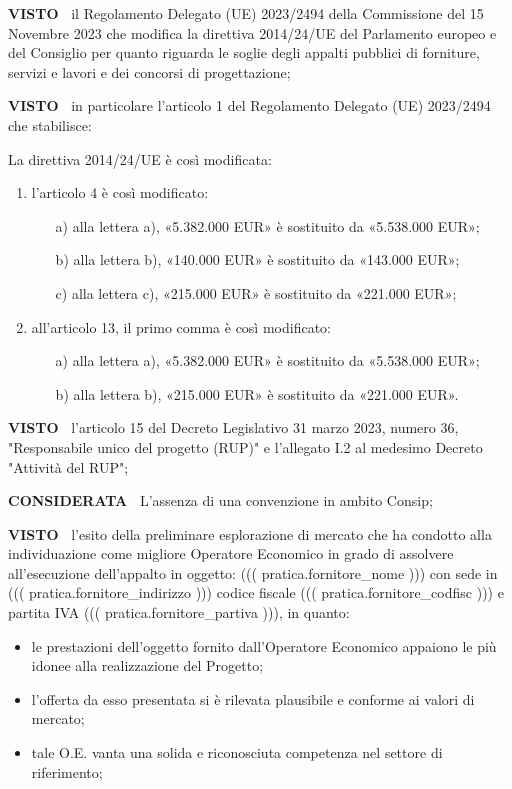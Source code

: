 \textbf{VISTO~} il Regolamento Delegato (UE)
2023/2494 della Commissione del 15 Novembre 2023 che modifica la direttiva
2014/24/UE del Parlamento europeo e del Consiglio per quanto riguarda
le soglie degli appalti pubblici di forniture, servizi e lavori e dei
concorsi di progettazione;

\textbf{VISTO~}  in particolare l'articolo 1 del Regolamento Delegato (UE)
2023/2494 che stabilisce:

La direttiva 2014/24/UE è così modificata: 
\begin{enumerate}
\item l'articolo 4 è così modificato: 
\begin{enumerate}
\item[a)]  alla lettera a), «5.382.000 EUR» è sostituito da «5.538.000 EUR»;
\item[b)]  alla lettera b), «140.000 EUR» è sostituito da «143.000 EUR»; 
\item[c)]  alla lettera c), «215.000 EUR» è sostituito da «221.000 EUR»; 
\end{enumerate}

\item all'articolo 13, il primo comma è così modificato: 
\begin{enumerate}
\item[a)]  alla lettera a), «5.382.000 EUR» è sostituito da «5.538.000 EUR»; 
\item[b)]  alla lettera b), «215.000 EUR» è sostituito da «221.000 EUR».
\end{enumerate}
\end{enumerate}

\textbf{VISTO~} l'articolo 15 del Decreto Legislativo 31
marzo 2023, numero 36, "Responsabile unico del progetto (RUP)" e
l'allegato I.2 al medesimo Decreto "Attività del RUP";

\textbf{CONSIDERATA~} L'assenza di una convenzione in ambito Consip;


\textbf{VISTO~} l'esito della preliminare
esplorazione di mercato che ha condotto alla individuazione come migliore
Operatore Economico in grado di assolvere all'esecuzione dell'appalto
in oggetto: ((( pratica.fornitore_nome ))) con sede in ((( pratica.fornitore_indirizzo )))
codice fiscale ((( pratica.fornitore_codfisc ))) e partita IVA ((( pratica.fornitore_partiva ))),
in quanto:

\begin{itemize}
\item  le prestazioni dell'oggetto fornito dall'Operatore Economico
appaiono le più idonee alla realizzazione del Progetto;

\item 
l'offerta da esso presentata si è rilevata plausibile e conforme
ai valori di mercato;

\item tale O.E. vanta una solida e riconosciuta
competenza nel settore di riferimento;

\end{itemize}

